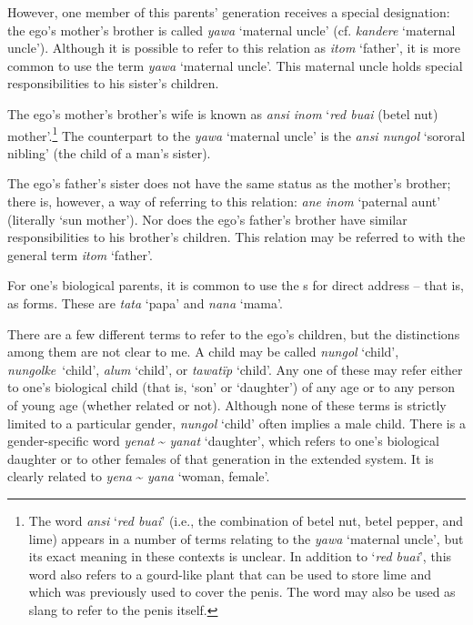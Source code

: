   However, one member of this parents’ generation receives a special designation: the ego’s mother’s brother is called \textit{yawa} ‘maternal uncle’ (cf.  \textit{kandere} ‘maternal uncle’). Although it is possible to refer to this relation as \textit{itom} ‘father’, it is more common to use the term \textit{yawa} ‘maternal uncle’. This maternal uncle holds special responsibilities to his sister’s children.

  The ego’s mother’s brother’s wife is known as \textit{ansi inom} ‘\textit{red buai} (betel nut) mother’.\footnote{The word \textit{ansi} ‘\textit{red buai}’ (i.e., the combination of betel nut, betel pepper, and lime) appears in a number of  terms relating to the \textit{yawa} ‘maternal uncle’, but its exact meaning in these contexts is unclear. In addition to ‘\textit{red buai}’, this word also refers to a gourd-like plant that can be used to store lime and which was previously used to cover the penis. The word may also be used as slang to refer to the penis itself.} The counterpart to the \textit{yawa} ‘maternal uncle’ is the \textit{ansi nungol} ‘sororal nibling’ (the child of a man’s sister).

  The ego’s father’s sister does not have the same status as the mother’s brother; there is, however, a  way of referring to this relation: \textit{ane inom} ‘paternal aunt’ (literally ‘sun mother’). Nor does the ego’s father’s brother have similar responsibilities to his brother’s children. This relation may be referred to with the general term \textit{itom} ‘father’.

  For one’s biological parents, it is common to use the s for direct address -- that is, as  forms. These are \textit{tata} ‘papa’ and \textit{nana} ‘mama’.

  There are a few different terms to refer to the ego’s children, but the distinctions among them are not clear to me. A child may be called \textit{nungol} ‘child’, \mbox{\textit{nungolke} ‘child’,} \textit{alum} ‘child’, or \textit{tawatïp} ‘child’. Any one of these may refer either to one’s biological child (that is, ‘son’ or ‘daughter’) of any age or to any person of young age (whether related or not). Although none of these terms is strictly limited to a particular gender, \textit{nungol} ‘child’ often implies a male child. There is a gender-specific word \textit{yenat} {\textasciitilde} \textit{yanat} ‘daughter’, which refers to one’s biological daughter or to other females of that generation in the extended  system. It is clearly related to \textit{yena} {\textasciitilde} \textit{yana} ‘woman, female’.

